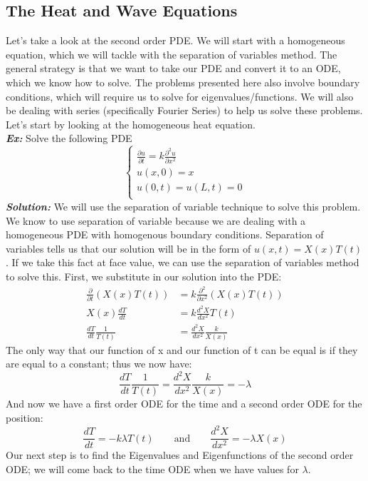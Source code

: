 \documentclass{article}
\begin{document}
\subsection{The Heat and Wave Equations}
\indent Let's take a look at the second order PDE. We will start with a homogeneous equation, which we will tackle with the separation of variables method. The general strategy is that we want to take our PDE and convert it to an ODE, which we know how to solve. The problems presented here also involve boundary conditions, which will require us to solve for eigenvalues/functions. We will also be dealing with series (specifically Fourier Series) to help us solve these problems. Let's start by looking at the homogeneous heat equation.\\
\noindent \textbf{\textit{Ex:}} Solve the following PDE
\[
\begin{cases}
\frac{\partial u}{\partial t} = k \frac{\partial^{2} u}{\partial x^{2}}\\
u(x,0) = x\\
u(0,t) = u(L,t) = 0\\
\end{cases}
\]
\indent \textbf{\textit{Solution:}} We will use the separation of variable technique to solve this problem. We know to use separation of variable because we are dealing with a homogeneous PDE with homogenous boundary conditions. Separation of variables tells us that our solution will be in the form of $ u(x,t) = X(x)T(t) $. If we take this fact at face value, we can use the separation of variables method to solve this. First, we substitute in our solution into the PDE:
\begin{align*}
\frac{\partial}{\partial t}(X(x)T(t)) &= k \frac{\partial^{2}}{\partial x^{2}}(X(x)T(t))\\
X(x)\frac{dT}{dt} &= k\frac{d^{2}X}{dx^{2}}T(t)\\
\frac{dT}{dt}\frac{1}{T(t)} &= \frac{d^{2}X}{dx^{2}}\frac{k}{X(x)}
\end{align*}
\noindent The only way that our function of x and our function of t can be equal is if they are equal to a constant;
thus we now have:
\[
\frac{dT}{dt}\frac{1}{T(t)} = \frac{d^{2}X}{dx^{2}}\frac{k}{X(x)} = -\lambda
\]
\noindent And now we have a first order ODE for the time and a second order ODE for the position:
\[
\frac{dT}{dt} = -k \lambda T(t) \qquad\text{and}\qquad \frac{d^{2}X}{dx^{2}} = -\lambda X(x)
\]
\noindent Our next step is to find the Eigenvalues and Eigenfunctions of the second order ODE; we will come back to the time ODE when we have values for $\lambda$.\\ 
\end{document}

